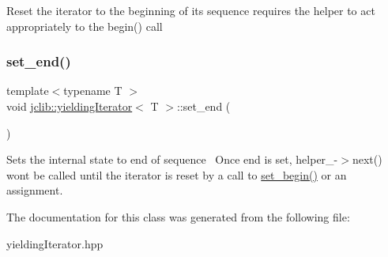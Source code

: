 Reset the iterator to the beginning of its sequence requires the helper to act appropriately to the begin() call \mbox{\label{classjclib_1_1yieldingIterator_ab824de9cf3585fe0e24d4efef9eb78d6}} 
\subsubsection{\texorpdfstring{set\+\_\+end()}{set\_end()}}
{\footnotesize\ttfamily template$<$typename T $>$ \\
void \hyperlink{classjclib_1_1yieldingIterator}{jclib\+::yielding\+Iterator}$<$ T $>$\+::set\+\_\+end (\begin{DoxyParamCaption}{ }\end{DoxyParamCaption})\hspace{0.3cm}{\ttfamily [inline]}}

Sets the internal state to end of sequence~\newline
 Once end is set, helper\+\_\+-\/$>$next() won\textquotesingle{}t be called until the iterator is reset by a call to \hyperlink{classjclib_1_1yieldingIterator_af6051397c336c96df0a31895b2f125ab}{set\+\_\+begin()} or an assignment. 

The documentation for this class was generated from the following file\+:\begin{DoxyCompactItemize}
\item 
yielding\+Iterator.\+hpp\end{DoxyCompactItemize}
